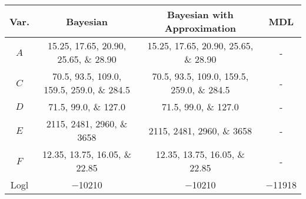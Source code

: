 \scriptsize
\begin{tabular}{cccc}
    \toprule
    Var. & Bayesian & Bayesian with Approximation & MDL \\
    \midrule
    $A$ & \numlist[list-final-separator = {, }]{15.25; 17.65; 20.90; 25.65; 28.90} & \numlist[list-final-separator = {, }]{15.25; 17.65; 20.90; 25.65; 28.90} & - \\
    $C$ & \numlist[list-final-separator = {, }]{70.5; 93.5; 109.0; 159.5; 259.0; 284.5} & \numlist[list-final-separator = {, }]{70.5;93.5;109.0;159.5;259.0;284.5} & - \\
    $D$ & \numlist[list-final-separator = {, }]{71.5;99.0;127.0} & \numlist[list-final-separator = {, }]{71.5;99.0; 127.0} & - \\
    $E$ & \numlist[list-final-separator = {, }]{2115;2481;2960;3658} & \numlist[list-final-separator = {, }]{2115;2481;2960;3658} & - \\
    $F$ & \numlist[list-final-separator = {, }]{12.35;13.75;16.05;22.85} & \numlist[list-final-separator = {, }]{12.35;13.75;16.05;22.85} & - \\
    \addlinespace[0.5em]
    Logl & \num{-10210} & \num{-10210} & \num{-11918} \\
    \bottomrule
\end{tabular}